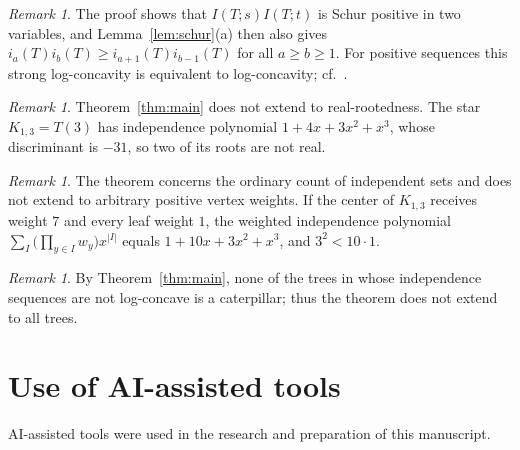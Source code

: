 \documentclass{amsart}
\theoremstyle{definition}
\theoremstyle{remark}
\newtheorem{remark}[theorem]{Remark}
\numberwithin{equation}{section}
\begin{document}
\begin{remark}
The proof shows that $I(T;s)I(T;t)$ is Schur positive in two variables, and Lemma~\ref{lem:schur}(a) then also gives $i_a(T)i_b(T)\ge i_{a+1}(T)i_{b-1}(T)$ for all $a\ge b\ge1$. For positive sequences this strong log-concavity is equivalent to log-concavity; cf.\ \cite[Theorem~1.3]{LLYZ}.
\end{remark}

\begin{remark}\label{rem:realroots}
Theorem~\ref{thm:main} does not extend to real-rootedness. The star $K_{1,3}=T(3)$ has independence polynomial $1+4x+3x^2+x^3$, whose discriminant is $-31$, so two of its roots are not real.
\end{remark}

\begin{remark}\label{rem:weights}
The theorem concerns the ordinary count of independent sets and does not extend to arbitrary positive vertex weights. If the center of $K_{1,3}$ receives weight $7$ and every leaf weight $1$, the weighted independence polynomial $\sum_I\bigl(\prod_{y\in I}w_y\bigr)x^{|I|}$ equals $1+10x+3x^2+x^3$, and $3^2<10\cdot1$.
\end{remark}

\begin{remark}
By Theorem~\ref{thm:main}, none of the trees in \cite{Gal26,KL,KLYM} whose independence sequences are not log-concave is a caterpillar; thus the theorem does not extend to all trees.
\end{remark}

\section*{Use of AI-assisted tools}
AI-assisted tools were used in the research and preparation of this manuscript.
\end{document}
